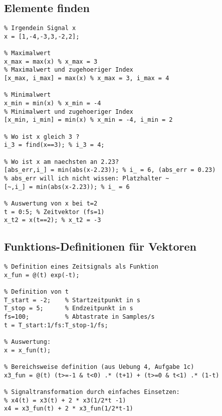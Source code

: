 \documentclass[threecolumn, german]{latex4ei/latex4ei_sheet}
\begin{document}
	\begin{minipage}{\linewidth}
	\begin{sectionbox}
		\subsection{Elemente finden}
		\begin{lstlisting}
% Irgendein Signal x
x = [1,-4,-3,3,-2,2];

% Maximalwert
x_max = max(x) % x_max = 3
% Maximalwert und zugehoeriger Index
[x_max, i_max] = max(x) % x_max = 3, i_max = 4

% Minimalwert
x_min = min(x) % x_min = -4
% Minimalwert und zugehoeriger Index
[x_min, i_min] = min(x) % x_min = -4, i_min = 2

% Wo ist x gleich 3 ?
i_3 = find(x==3); % i_3 = 4;

% Wo ist x am naechsten an 2.23?
[abs_err,i_] = min(abs(x-2.23)); % i_ = 6, (abs_err = 0.23)
% abs_err will ich nicht wissen: Platzhalter ~
[~,i_] = min(abs(x-2.23)); % i_ = 6

% Auswertung von x bei t=2
t = 0:5; % Zeitvektor (fs=1)
x_t2 = x(t==2); % x_t2 = -3
		\end{lstlisting}
	\end{sectionbox}
\end{minipage}
	
	\begin{sectionbox}
		\subsection{Funktions-Definitionen für Vektoren}
		\begin{lstlisting}
% Definition eines Zeitsignals als Funktion
x_fun = @(t) exp(-t);

% Definition von t
T_start = -2;    % Startzeitpunkt in s
T_stop = 5;      % Endzeitpunkt in s
fs=100;          % Abtastrate in Samples/s
t = T_start:1/fs:T_stop-1/fs;

% Auswertung:
x = x_fun(t);

% Bereichsweise definition (aus Uebung 4, Aufgabe 1c)
x3_fun = @(t) (t>=-1 & t<0) .* (t+1) + (t>=0 & t<1) .* (1-t)

% Signaltransformation durch einfaches Einsetzen:
% x4(t) = x3(t) + 2 * x3(1/2*t -1)
x4 = x3_fun(t) + 2 * x3_fun(1/2*t-1)
		\end{lstlisting}
	\end{sectionbox}
	
\end{document}
